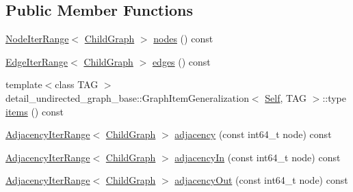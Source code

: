 \subsection*{Public Member Functions}
\begin{DoxyCompactItemize}
\item 
\hyperlink{structnifty_1_1graph_1_1UndirectedGraphBase_1_1NodeIterRange}{Node\+Iter\+Range}$<$ \hyperlink{classnifty_1_1graph_1_1UndirectedGraphBase_af2541cf9fb91440ff0a7b56dd5a6be29}{Child\+Graph} $>$ \hyperlink{classnifty_1_1graph_1_1UndirectedGraphBase_ae143a4dc03467aad4b89a627ae6fdfc7}{nodes} () const 
\item 
\hyperlink{structnifty_1_1graph_1_1UndirectedGraphBase_1_1EdgeIterRange}{Edge\+Iter\+Range}$<$ \hyperlink{classnifty_1_1graph_1_1UndirectedGraphBase_af2541cf9fb91440ff0a7b56dd5a6be29}{Child\+Graph} $>$ \hyperlink{classnifty_1_1graph_1_1UndirectedGraphBase_a45e69adbc55f3841a414a886b97d9672}{edges} () const 
\item 
{\footnotesize template$<$class T\+A\+G $>$ }\\detail\+\_\+undirected\+\_\+graph\+\_\+base\+::\+Graph\+Item\+Generalization$<$ \hyperlink{classnifty_1_1graph_1_1UndirectedGraphBase_a3a637f240a8d05794be99e5f290a71b9}{Self}, T\+A\+G $>$\+::type \hyperlink{classnifty_1_1graph_1_1UndirectedGraphBase_a40f5b095eec6297939d5ec7ffa785c13}{items} () const 
\item 
\hyperlink{structnifty_1_1graph_1_1UndirectedGraphBase_1_1AdjacencyIterRange}{Adjacency\+Iter\+Range}$<$ \hyperlink{classnifty_1_1graph_1_1UndirectedGraphBase_af2541cf9fb91440ff0a7b56dd5a6be29}{Child\+Graph} $>$ \hyperlink{classnifty_1_1graph_1_1UndirectedGraphBase_a7077e010ade064cd0e5f7bbca55120b7}{adjacency} (const int64\+\_\+t node) const 
\item 
\hyperlink{structnifty_1_1graph_1_1UndirectedGraphBase_1_1AdjacencyIterRange}{Adjacency\+Iter\+Range}$<$ \hyperlink{classnifty_1_1graph_1_1UndirectedGraphBase_af2541cf9fb91440ff0a7b56dd5a6be29}{Child\+Graph} $>$ \hyperlink{classnifty_1_1graph_1_1UndirectedGraphBase_a6ed7fbd6938aad8f6520eb3298bbe24e}{adjacency\+In} (const int64\+\_\+t node) const 
\item 
\hyperlink{structnifty_1_1graph_1_1UndirectedGraphBase_1_1AdjacencyIterRange}{Adjacency\+Iter\+Range}$<$ \hyperlink{classnifty_1_1graph_1_1UndirectedGraphBase_af2541cf9fb91440ff0a7b56dd5a6be29}{Child\+Graph} $>$ \hyperlink{classnifty_1_1graph_1_1UndirectedGraphBase_af23538c8549cdce616df93f6a0d0f229}{adjacency\+Out} (const int64\+\_\+t node) const 
\item 

\end{DoxyCompactItemize}
